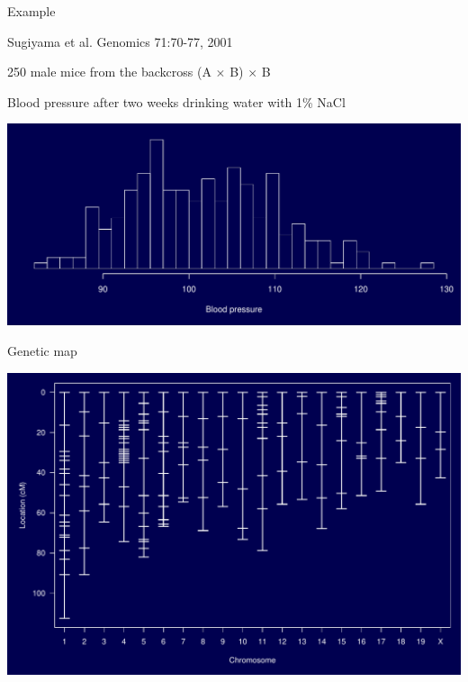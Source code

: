 \documentclass[12pt]{article}
\newcommand{\headsize}{\fontsize{35}{35} \selectfont}
\newcommand{\smallersize}{\fontsize{20}{25} \selectfont}
\newcommand{\smallestsize}{\fontsize{18}{22} \selectfont}
\begin{document}
\newpage

\addtocounter{page}{-1}

\headsize \color{myyellow}
\hfill \begin{minipage}{5.75in}
\centering
Example
\end{minipage}

\vspace{30mm}

\hfill
\begin{minipage}{10in}
\smallersize \color{mywhite}
Sugiyama et al. Genomics 71:70-77, 2001

\vspace{16pt}

\smallestsize
\color{myblue}
250 male mice from the backcross (A $\times$ B) $\times$ B

Blood pressure after two weeks drinking water with 1\% NaCl
\end{minipage}

\vspace{15mm}


\centerline{\includegraphics{FigsB/pheno.pdf}}

\newpage

\headsize \color{myyellow}
\hfill \begin{minipage}{5.75in}
\centering
Genetic map
\end{minipage}

\vfill

\centerline{\includegraphics{FigsB/geneticmap.pdf}}
\end{document}
